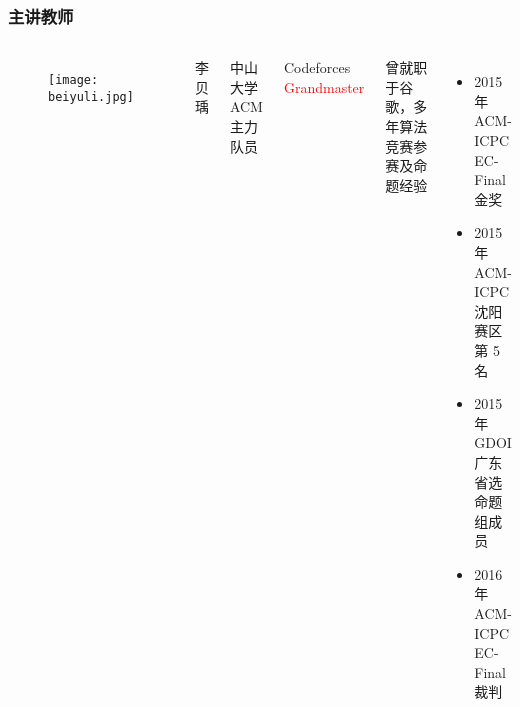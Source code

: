\begin{frame}[fragile]
    \frametitle{主讲教师}

    \begin{columns}
        \begin{figure}
            \texttt{[image: beiyuli.jpg]}
        \end{figure}

        李贝瑀

        \vspace{.5ex}

        {\footnotesize 中山大学 ACM 主力队员}

        \vspace{.5ex}

        {\footnotesize Codeforces \textcolor{red}{Grandmaster}}

        \vspace{.5ex}

        {\footnotesize 曾就职于谷歌，多年算法竞赛参赛及命题经验}

        \vspace{.5ex}

        \begin{itemize}
            \item {\footnotesize 2015 年 ACM-ICPC EC-Final 金奖}
            \item {\footnotesize 2015 年 ACM-ICPC 沈阳赛区第 5 名}
            \item {\footnotesize 2015 年 GDOI 广东省选命题组成员}
            \item {\footnotesize 2016 年 ACM-ICPC EC-Final 裁判}
        \end{itemize}
    \end{columns}
\end{frame}
